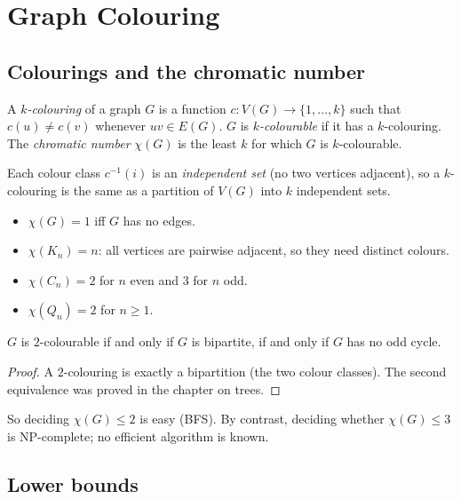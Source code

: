 \chapter{Graph Colouring}


\section{Colourings and the chromatic number}

\begin{definition}[$k$-colouring]
A \emph{$k$-colouring} of a graph $G$ is a function $c : V(G) \to \{1, \dots, k\}$ such that
$c(u) \ne c(v)$ whenever $uv \in E(G)$. $G$ is \emph{$k$-colourable} if it has a $k$-colouring.
The \emph{chromatic number} $\chi(G)$ is the least $k$ for which $G$ is $k$-colourable.
\end{definition}

Each colour class $c^{-1}(i)$ is an \emph{independent set} (no two vertices adjacent), so a
$k$-colouring is the same as a partition of $V(G)$ into $k$ independent sets.

\begin{example}
\begin{itemize}
  \item $\chi(G) = 1$ iff $G$ has no edges.
  \item $\chi(K_n) = n$: all vertices are pairwise adjacent, so they need distinct colours.
  \item $\chi(C_n) = 2$ for $n$ even and $3$ for $n$ odd.
  \item $\chi(Q_n) = 2$ for $n \ge 1$.
\end{itemize}
\end{example}

\begin{theorem}
$G$ is $2$-colourable if and only if $G$ is bipartite, if and only if $G$ has no odd cycle.
\end{theorem}
\begin{proof}
A $2$-colouring is exactly a bipartition (the two colour classes). The second equivalence was
proved in the chapter on trees.
\end{proof}

So deciding $\chi(G) \le 2$ is easy (BFS). By contrast, deciding whether $\chi(G) \le 3$ is
NP-complete; no efficient algorithm is known.

\section{Lower bounds}

